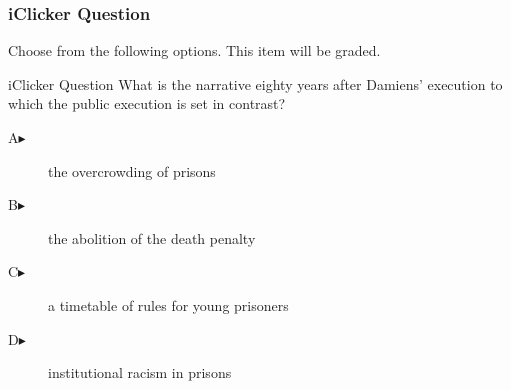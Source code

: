 \begin{frame}
  \frametitle{iClicker Question}
Choose from the following options. This item will be graded.
\begin{block}{iClicker Question}
What is the narrative eighty years after Damiens' execution to which
the public execution is set in contrast?
\end{block}
\begin{description}
\item[A\hspace{.2in}$\blacktriangleright$] the overcrowding of prisons
\item[B\hspace{.2in}$\blacktriangleright$] the abolition of the death penalty
\item[C\hspace{.2in}$\blacktriangleright$] a timetable of rules for young prisoners
\item[D\hspace{.2in}$\blacktriangleright$] institutional racism in prisons
\end{description}
\end{frame}
